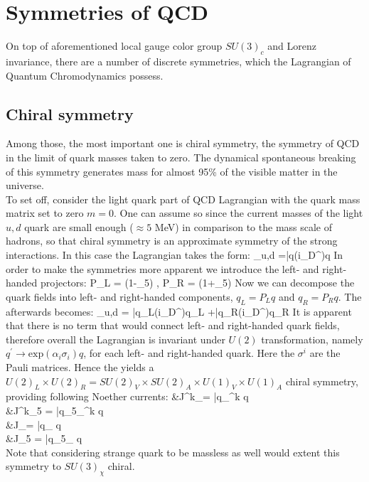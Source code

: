 \section{Symmetries of QCD}
	On top of aforementioned local gauge color group $SU(3)_c$ and Lorenz invariance, there are a number of discrete symmetries, which the Lagrangian of Quantum Chromodynamics possess. %
	\subsection*{Chiral symmetry}
	Among those, the most important one is chiral symmetry, the symmetry of QCD in the limit of quark masses taken to zero. The dynamical spontaneous breaking of this symmetry generates mass for almost 95\% of the visible matter in the universe.   \\
	
	To set off, consider the light quark part of QCD Lagrangian \Eq{\ref{qcd_low:L_QCD}} with the quark mass matrix set to zero $m=0$. One can assume so since the current masses of the light $u,d$ quark are small enough ($\approx 5$ MeV) in comparison to the mass scale of hadrons, so that chiral symmetry is an approximate symmetry of the strong interactions. In this case the Lagrangian takes the form:
	\beqa
		\label{qcd_low:L_QCD_chiral}
		_{u,d} =\bar{q}(i\gamma_\mu D^\mu)q
	\eeqa	
	In order to make the symmetries more apparent we introduce the left- and right-handed projectors:
	\beqa
		P_L = (1-\gamma_5) \;, \;\;\;\;\;\;\;\;\;\;\;\; P_R = (1+\gamma_5)
	\eeqa
	Now we can decompose the quark fields into left- and right-handed components, $q_L = P_L q$ and $q_R = P_R q$. The \Eq{\ref{qcd_low:L_QCD_chiral}} afterwards becomes:
	\beqa
		\label{qcd_low:L_QCD_chiral_RL}
		_{u,d} = \bar{q_L}(i\gamma_\mu D^\mu)q_L +\bar{q_R}(i\gamma_\mu D^\mu)q_R
	\eeqa
	It is  apparent that there is no term that would connect left- and right-handed quark fields, therefore overall the Lagrangian is invariant under $U(2)$ transformation, namely $q^\prime \rightarrow \text{exp}(\alpha_i \sigma_i) q$, for each left- and right-handed quark. Here the $\sigma^i$ are the Pauli matrices. Hence the \Eq{\ref{qcd_low:L_QCD_chiral_RL}} yields a $U(2)_L \times U(2)_R = SU(2)_V \times SU(2)_A \times U(1)_V \times U(1)_A$ chiral symmetry, providing following Noether currents:
	\beqa
		\label{qcd_low:Noether_currents}
		&J^k_\mu = \bar{q}\gamma_{\mu}\sigma^k q \\
		&J^k_{5\mu} = \bar{q}\gamma_5\gamma_{\mu}\sigma^k q\\
		&J_\mu = \bar{q}\gamma_{\mu} q\\ 
		&J_{5\mu} = \bar{q}\gamma_5\gamma_{\mu} q\\ 
	\eeqa
Note that considering strange quark to be massless as well would extent this symmetry to $SU(3)_{\chi}$ chiral. \\

